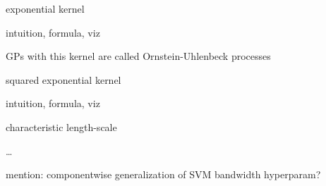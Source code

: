 \documentclass[11pt,compress,t,notes=noshow, xcolor=table]{beamer}
\begin{document}
\begin{framei}[sep=L]{exponential kernel}
\item intuition, formula, viz
\item GPs with this kernel are called Ornstein-Uhlenbeck processes
\end{framei}

\begin{framei}[sep=L]{squared exponential kernel}
\item intuition, formula, viz
\end{framei}

\begin{framei}[sep=L]{characteristic length-scale}
\item \dots
\item mention: componentwise generalization of SVM bandwidth hyperparam?
\end{framei}







\end{document}
